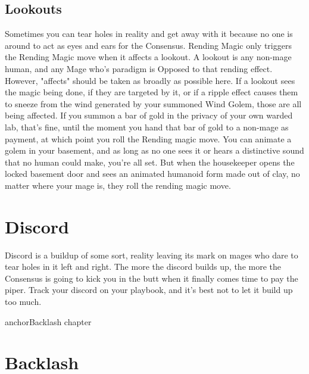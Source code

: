 \documentclass[
  oneside,
  statementpaper,
  9pt]{memoir}
\begin{document}
\hypertarget{lookouts}{%
\subsection{Lookouts}\label{lookouts}}

\begin{Player}

Sometimes you can tear holes in reality and get away with it because no one is around to act as eyes and ears for the Consensus. Rending Magic only triggers the Rending Magic move when it affects a lookout. A lookout is any non-mage human, and any Mage who’s paradigm is Opposed to that rending effect. However, "affects" should be taken as broadly as possible here. If a lookout sees the magic being done, if they are targeted by it, or if a ripple effect causes them to sneeze from the wind generated by your summoned Wind Golem, those are all being affected. If you summon a bar of gold in the privacy of your own warded lab, that’s fine, until the moment you hand that bar of gold to a non-mage as payment, at which point you roll the Rending magic move. You can animate a golem in your basement, and as long as no one sees it or hears a distinctive sound that no human could make, you’re all set. But when the housekeeper opens the locked basement door and sees an animated humanoid form made out of clay, no matter where your mage is, they roll the rending magic move.

\end{Player}

\hypertarget{discord}{%
\section{Discord}\label{discord}}

\begin{Player}

Discord is a buildup of some sort, reality leaving its mark on mages who dare to tear holes in it left and right. The more the discord builds up, the more the Consensus is going to kick you in the butt when it finally comes time to pay the piper. Track your discord on your playbook, and it’s best not to let it build up too much.

{{anchorBacklash chapter}}

\end{Player}

\hypertarget{backlash}{%
\section{Backlash}\label{backlash}}
\end{document}
